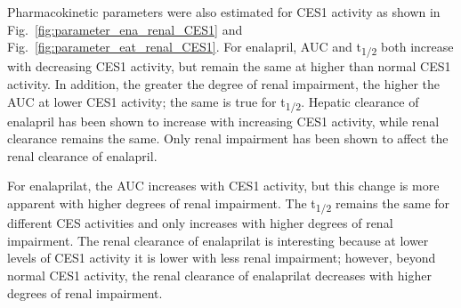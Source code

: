 \documentclass[pharmaceutics,article,submit,pdftex,moreauthors]{Definitions/mdpi}
\begin{document}
Pharmacokinetic parameters were also estimated for CES1 activity as shown in Fig.~\ref{fig:parameter_ena_renal_CES1} and Fig.~\ref{fig:parameter_eat_renal_CES1}. For enalapril, AUC and t\textsubscript{1/2} both increase with decreasing CES1 activity, but remain the same at higher than normal CES1 activity. In addition, the greater the degree of renal impairment, the higher the AUC at lower CES1 activity; the same is true for t\textsubscript{1/2}. Hepatic clearance of enalapril has been shown to increase with increasing CES1 activity, while renal clearance remains the same. Only renal impairment has been shown to affect the renal clearance of enalapril.

For enalaprilat, the AUC increases with CES1 activity, but this change is more apparent with higher degrees of renal impairment. The t\textsubscript{1/2} remains the same for different CES activities and only increases with higher degrees of renal impairment. The renal clearance of enalaprilat is interesting because at lower levels of CES1 activity it is lower with less renal impairment; however, beyond normal CES1 activity, the renal clearance of enalaprilat decreases with higher degrees of renal impairment.

\end{document}
